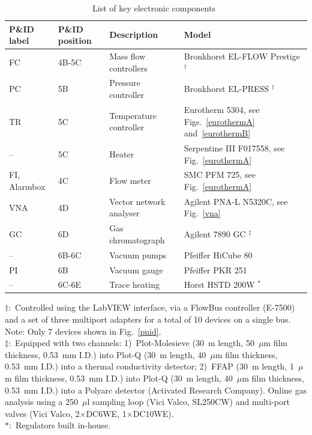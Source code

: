 \documentclass[12pt]{article}
\begin{document}
\begin{table}[p]
\caption{List of key electronic components~\label{inst}}
\small
\begin{tabular}{l|l|l|l}
P\&ID label & P\&ID position & Description & Model \\ \hline
FC & 4B-5C & Mass flow controllers & Bronkhorst EL-FLOW Prestige $^\dagger$ \\
PC & 5B & Pressure controller & Bronkhorst EL-PRESS $^\dagger$ \\
TR & 5C & Temperature controller & Eurotherm 5304, see Figs.~\ref{eurothermA} and~\ref{eurothermB} \\
-- & 5C & Heater & Serpentine III F017558, see Fig.~\ref{eurothermA} \\
FI, Alarmbox & 4C & Flow meter & SMC PFM 725, see Fig.~\ref{eurothermA}  \\
VNA & 4D & Vector network analyser & Agilent PNA-L N5320C, see Fig.~\ref{vna} \\
GC & 6D & Gas chromatograph & Agilent 7890 GC  $^\ddagger$  \\
-- & 6B-6C & Vacuum pumps & Pfeiffer HiCube 80 \\
PI & 6B & Vacuum gauge & Pfeiffer PKR 251 \\
-- & 6C-6E & Trace heating & Horst HSTD 200W $^*$ \\ \hline
\end{tabular}
\vspace{0.5em}

$\dagger:$ Controlled using the LabVIEW interface, via a FlowBus controller (E-7500) and a set of three multiport adapters for a total of 10 devices on a single bus. Note: Only 7 devices shown in Fig.~\ref{pnid}.\\

$\ddagger:$ Equipped with two channels: 1)~Plot-Molesieve (30~m length, 50~$\mu$m film thickness, 0.53~mm I.D.) into Plot-Q (30~m length, 40~$\mu$m film thickness, 0.53~mm I.D.) into a thermal conductivity detector; 2)~FFAP (30~m length, 1~$\mu$m film thickness, 0.53~mm I.D.) into Plot-Q (30~m length, 40~$\mu$m film thickness, 0.53~mm I.D.) into a Polyarc detector (Activated Research Company). Online gas analysis using a 250~$\mu$l sampling loop (Vici Valco, SL250CW) and multi-port valves (Vici Valco, 2$\times$DC6WE, 1$\times$DC10WE).\\

$*:$ Regulators built in-house.

\end{table}
\end{document}
